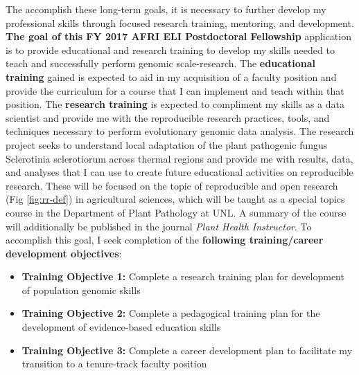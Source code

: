 \documentclass[12pt,letterpaper]{article}
\begin{document}
The accomplish these long-term goals, it is necessary to further develop my professional skills through focused research training, mentoring, and development. 
\textbf{The goal of this FY 2017 AFRI ELI Postdoctoral Fellowship} application is to provide educational and research training to develop my skills needed to teach and successfully perform genomic scale-research. 
The \textbf{educational training} gained is expected to aid in my acquisition of a faculty position and provide the curriculum for a course that I can implement and teach within that position. 
The \textbf{research training} is expected to compliment my skills as a data scientist and provide me with the reproducible research practices, tools, and techniques necessary to perform evolutionary genomic data analysis. 
The research project seeks to understand local adaptation of the plant pathogenic fungus Sclerotinia sclerotiorum across thermal regions and provide me with results, data, and analyses that I can use to create future educational activities on reproducible research. 
These will be focused on the topic of reproducible and open research (Fig \ref{fig:rr-def}) in agricultural sciences, which will be taught as a special topics course in the Department of Plant Pathology at UNL. 
A summary of the course will additionally be published in the journal \textit{Plant Health Instructor}. 
To accomplish this goal, I seek completion of the \textbf{following training/career development objectives}:
\begin{itemize}
  \item \textbf{Training Objective 1:} Complete a research training plan for development of population genomic skills
  \item \textbf{Training Objective 2:} Complete a pedagogical training plan for the development of evidence-based education skills
  \item \textbf{Training Objective 3:} Complete a career development plan to facilitate my transition to a tenure-track faculty position
\end{itemize}


\end{document}
